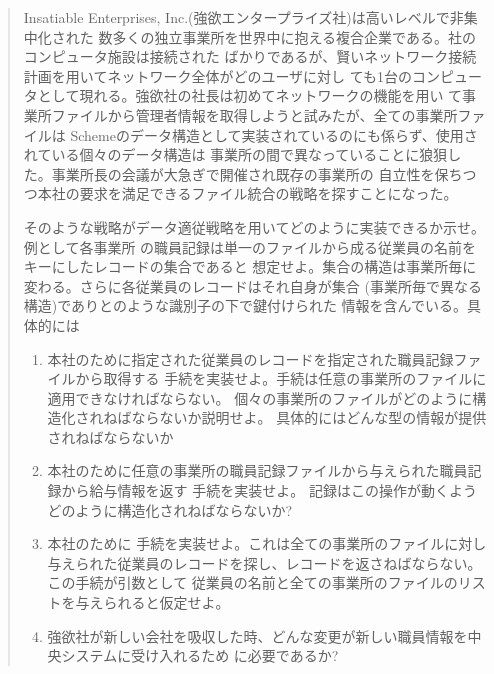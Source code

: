 \begin{quote}
Insatiable Enterprises, Inc.(強欲エンタープライズ社)は高いレベルで非集中化された
数多くの独立事業所を世界中に抱える複合企業である。社のコンピュータ施設は接続された
ばかりであるが、賢いネットワーク接続計画を用いてネットワーク全体がどのユーザに対し
ても1台のコンピュータとして現れる。強欲社の社長は初めてネットワークの機能を用い
て事業所ファイルから管理者情報を取得しようと試みたが、全ての事業所ファイルは
Schemeのデータ構造として実装されているのにも係らず、使用されている個々のデータ構造は
事業所の間で異なっていることに狼狽した。事業所長の会議が大急ぎで開催され既存の事業所の
自立性を保ちつつ本社の要求を満足できるファイル統合の戦略を探すことになった。



そのような戦略がデータ適従戦略を用いてどのように実装できるか示せ。例として各事業所
の職員記録は単一のファイルから成る従業員の名前をキーにしたレコードの集合であると
想定せよ。集合の構造は事業所毎に変わる。さらに各従業員のレコードはそれ自身が集合
(事業所毎で異なる構造)でありとのような識別子の下で鍵付けられた
情報を含んでいる。具体的には

\begin{enumerate}[a]

\item
本社のために指定された従業員のレコードを指定された職員記録ファイルから取得する
手続を実装せよ。手続は任意の事業所のファイルに適用できなければならない。
個々の事業所のファイルがどのように構造化されねばならないか説明せよ。
具体的にはどんな型の情報が提供されねばならないか

\item
本社のために任意の事業所の職員記録ファイルから与えられた職員記録から給与情報を返す
手続を実装せよ。
記録はこの操作が動くようどのように構造化されねばならないか?

\item
本社のために 手続を実装せよ。これは全ての事業所のファイルに対し
与えられた従業員のレコードを探し、レコードを返さねばならない。この手続が引数として
従業員の名前と全ての事業所のファイルのリストを与えられると仮定せよ。

\item
強欲社が新しい会社を吸収した時、どんな変更が新しい職員情報を中央システムに受け入れるため
に必要であるか?

\end{enumerate}
\end{quote}

